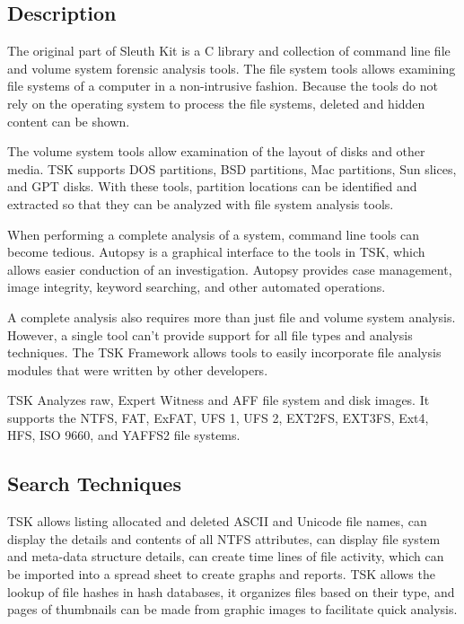 \subsection{Description}

The original part of Sleuth Kit is a C library and collection of command line
file and volume system forensic analysis tools. The file system tools allows examining file systems
of a computer in a non-intrusive fashion. Because the tools do not rely on the operating system to process
the file systems, deleted and hidden content can be shown.

The volume system tools allow examination of the layout of disks
and other media. TSK supports DOS partitions, BSD partitions, Mac partitions, Sun slices, and 
GPT disks. With these tools, partition locations can be identified 
and extracted so that they can be analyzed with file system analysis tools.

When performing a complete analysis of a system, command line 
tools can become tedious. Autopsy is a graphical interface to the tools in TSK, 
which allows easier conduction of an investigation. Autopsy 
provides case management, image integrity, keyword searching, and other automated
operations.

A complete analysis also requires more than just file and volume system analysis.
However, a single tool can't provide support for all file types and analysis 
techniques. The TSK Framework allows tools to easily incorporate file analysis
modules that were written by other developers.

TSK Analyzes raw, Expert Witness and AFF file system and disk images.
It supports the NTFS, FAT, ExFAT, UFS 1, UFS 2, EXT2FS, EXT3FS, Ext4, HFS, ISO 9660,
and YAFFS2 file systems.

\subsection{Search Techniques}

TSK allows listing allocated and deleted ASCII and Unicode file names, can display the
details and contents of all NTFS attributes, can display file system and meta-data structure details,
can create time lines of file activity, which can be imported into a spread sheet to create graphs and reports.
TSK allows the lookup of file hashes in hash databases, it organizes files based on their type, and pages of
thumbnails can be made from graphic images to facilitate quick analysis.


